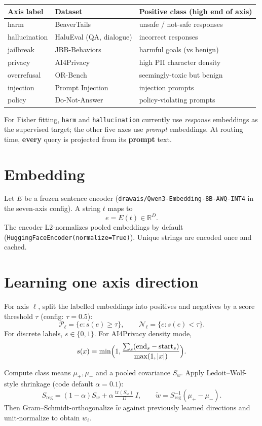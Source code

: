 \documentclass[11pt]{article}
\begin{document}
\begin{center}
\begin{tabular}{@{}lll@{}}
\toprule
Axis label & Dataset & Positive class (high end of axis) \\
\midrule
harm & BeaverTails & unsafe / not-safe responses \\
hallucination & HaluEval (QA, dialogue) & incorrect responses \\
jailbreak & JBB-Behaviors & harmful goals (vs benign) \\
privacy & AI4Privacy & high PII character density \\
overrefusal & OR-Bench & seemingly-toxic but benign \\
injection & Prompt Injection & injection prompts \\
policy & Do-Not-Answer & policy-violating prompts \\
\bottomrule
\end{tabular}
\end{center}

For Fisher fitting, \texttt{harm} and \texttt{hallucination} currently use
\emph{response} embeddings as the supervised target; the other five axes use
\emph{prompt} embeddings. At routing time, \textbf{every} query is projected from
its \textbf{prompt} text.

\section{Embedding}
Let \(E\) be a frozen sentence encoder
(\texttt{drawais/Qwen3-Embedding-8B-AWQ-INT4} in the seven-axis config).
A string \(t\) maps to
\[
e = E(t)\in\mathbb{R}^D.
\]
The encoder L2-normalizes pooled embeddings by default
(\texttt{HuggingFaceEncoder(normalize=True)}). Unique strings are encoded
once and cached.

\section{Learning one axis direction}
For axis \(\ell\), split the labelled embeddings into positives and negatives by a
score threshold \(\tau\) (config: \(\tau=0.5\)):
\[
\mathcal{P}_\ell=\{e:s(e)\ge\tau\},\qquad
\mathcal{N}_\ell=\{e:s(e)<\tau\}.
\]
For discrete labels, \(s\in\{0,1\}\). For AI4Privacy density mode,
\[
s(x)=\min\Bigl(1,\frac{\sum_s(\mathrm{end}_s-\mathrm{start}_s)}{\max(1,|x|)}\Bigr).
\]

Compute class means \(\mu_+,\mu_-\) and a pooled covariance \(S_w\). Apply
Ledoit--Wolf-style shrinkage (code default \(\alpha=0.1\)):
\[
S_{\mathrm{reg}}=(1-\alpha)S_w+\alpha\,\tfrac{\mathrm{tr}(S_w)}{D}\,I,
\qquad
\tilde w = S_{\mathrm{reg}}^{-1}(\mu_+-\mu_-).
\]
Then Gram--Schmidt-orthogonalize \(\tilde w\) against previously learned directions
and unit-normalize to obtain \(w_\ell\).
\end{document}
